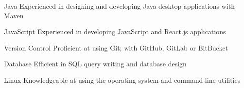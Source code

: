 

\begin{cvskills}

  \cvskill
    {Java} %
    {Experienced in designing and developing Java desktop applications with Maven}
    
  \cvskill
    {JavaScript} %
    {Experienced in developing JavaScript and React.js applications}
    
  \cvskill
    {Version Control} %
    {Proficient at using Git; with GitHub, GitLab or BitBucket}
    
  \cvskill
    {Database} %
    {Efficient in SQL query writing and database design}
    
  \cvskill
    {Linux} %
    {Knowledgeable at using the operating system and command-line utilities}

\end{cvskills}
